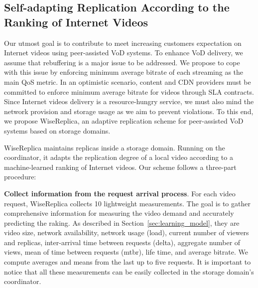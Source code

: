 %



\subsection{Self-adapting Replication According to the Ranking of Internet Videos}
\label{subsec:wisereplica_replication_strategy}

Our utmost goal is to contribute to meet increasing customers expectation on Internet videos using peer-assisted VoD systems. To enhance VoD delivery, we assume that rebuffering is a major issue to be addressed. We propose to cope with this issue by enforcing minimum average bitrate of each streaming as the main QoS metric. In an optimistic scenario, content and CDN providers must be committed to enforce minimum average bitrate for videos through SLA contracts. Since Internet videos delivery is a resource-hungry service, we must also mind the network provision and storage usage as we aim to prevent violations. To this end, we propose WiseReplica, an adaptive replication scheme for peer-assisted VoD systems based on storage domains.

WiseReplica maintains replicas inside a storage domain. Running on the coordinator, it adapts the replication degree of a local video according to a machine-learned ranking of Internet videos. Our scheme follows a three-part procedure: 

\noindent
\textbf{Collect information from the request arrival process}. For each video request, WiseReplica collects 10 lightweight measurements. The goal is to gather comprehensive information for measuring the video demand and accurately predicting the raking. As described in Section~\ref{sec:learning_model}, they are video size, network availability, network usage (load), current number of viewers and replicas, inter-arrival time between requests (delta), aggregate number of views, mean of time between requests (mtbr), life time, and average bitrate. We compute averages and means from the last up to five requests. It is important to notice that all these measurements can be easily collected in the storage domain's coordinator.
 
